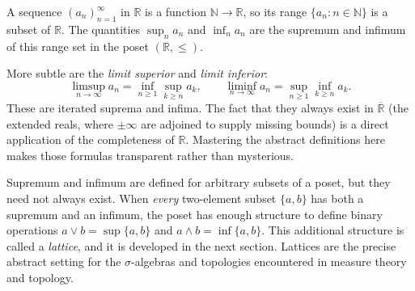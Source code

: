 \begin{remark*}
\label{rem:seq-sup-inf}
A sequence $(a_n)_{n=1}^{\infty}$ in $\mathbb{R}$ is a function
$\mathbb{N} \to \mathbb{R}$, so its range $\{a_n : n \in \mathbb{N}\}$ is a
subset of $\mathbb{R}$.  The quantities $\sup_n a_n$ and $\inf_n a_n$ are
the supremum and infimum of this range set in the poset $(\mathbb{R}, \leq)$.

More subtle are the \emph{limit superior} and \emph{limit inferior}:
\[
  \limsup_{n\to\infty} a_n = \inf_{n \geq 1} \sup_{k \geq n} a_k,
  \qquad
  \liminf_{n\to\infty} a_n = \sup_{n \geq 1} \inf_{k \geq n} a_k.
\]
These are iterated suprema and infima.  The fact that they always exist in
$\overline{\mathbb{R}}$ (the extended reals, where $\pm\infty$ are adjoined
to supply missing bounds) is a direct application of the completeness of
$\mathbb{R}$.  Mastering the abstract definitions here makes those formulas
transparent rather than mysterious.
\end{remark*}

\begin{remark*}[Transition]
\label{rem:transition-to-lattice}
Supremum and infimum are defined for arbitrary subsets of a poset, but they
need not always exist.  When \emph{every} two-element subset $\{a,b\}$ has
both a supremum and an infimum, the poset has enough structure to define
binary operations $a \vee b = \sup\{a,b\}$ and $a \wedge b = \inf\{a,b\}$.
This additional structure is called a \emph{lattice}, and it is developed in
the next section.  Lattices are the precise abstract setting for the
$\sigma$-algebras and topologies encountered in measure theory and topology.
\end{remark*}
